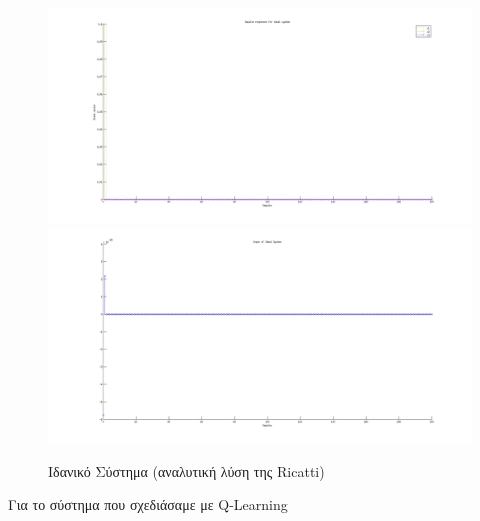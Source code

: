 \documentclass[a4paper,oneside,12pt]{article}
\begin{document}
\begin{figure}[H]
\centering
\includegraphics[scale=0.35]{ideal_state.png} \\
\includegraphics[scale=0.35]{ideal_input.png}
\caption{Ιδανικό Σύστημα (αναλυτική λύση της Ricatti)}
\label{}
\end{figure}


Για το σύστημα που σχεδιάσαμε με Q-Learning
\end{document}
